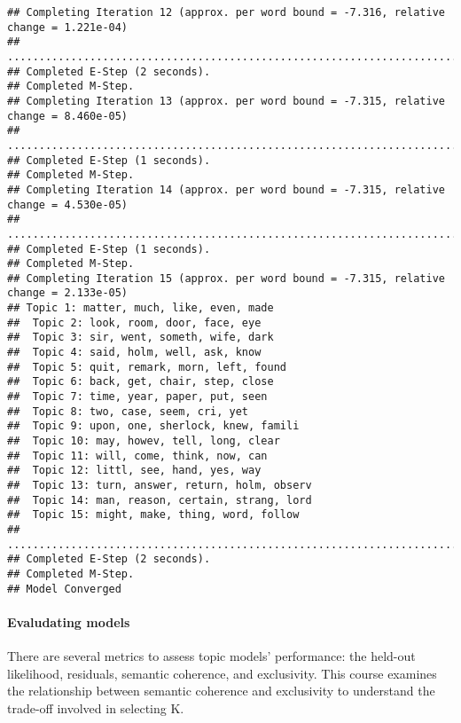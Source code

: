 \documentclass[
]{book}
\begin{document}
\begin{verbatim}
## Completing Iteration 12 (approx. per word bound = -7.316, relative change = 1.221e-04) 
## ....................................................................................................
## Completed E-Step (2 seconds). 
## Completed M-Step. 
## Completing Iteration 13 (approx. per word bound = -7.315, relative change = 8.460e-05) 
## ....................................................................................................
## Completed E-Step (1 seconds). 
## Completed M-Step. 
## Completing Iteration 14 (approx. per word bound = -7.315, relative change = 4.530e-05) 
## ....................................................................................................
## Completed E-Step (1 seconds). 
## Completed M-Step. 
## Completing Iteration 15 (approx. per word bound = -7.315, relative change = 2.133e-05) 
## Topic 1: matter, much, like, even, made 
##  Topic 2: look, room, door, face, eye 
##  Topic 3: sir, went, someth, wife, dark 
##  Topic 4: said, holm, well, ask, know 
##  Topic 5: quit, remark, morn, left, found 
##  Topic 6: back, get, chair, step, close 
##  Topic 7: time, year, paper, put, seen 
##  Topic 8: two, case, seem, cri, yet 
##  Topic 9: upon, one, sherlock, knew, famili 
##  Topic 10: may, howev, tell, long, clear 
##  Topic 11: will, come, think, now, can 
##  Topic 12: littl, see, hand, yes, way 
##  Topic 13: turn, answer, return, holm, observ 
##  Topic 14: man, reason, certain, strang, lord 
##  Topic 15: might, make, thing, word, follow 
## ....................................................................................................
## Completed E-Step (2 seconds). 
## Completed M-Step. 
## Model Converged
\end{verbatim}

\hypertarget{evaludating-models}{%
\paragraph{Evaludating models}\label{evaludating-models}}

There are several metrics to assess topic models' performance: the held-out likelihood, residuals, semantic coherence, and exclusivity. This course examines the relationship between semantic coherence and exclusivity to understand the trade-off involved in selecting K.
\end{document}
